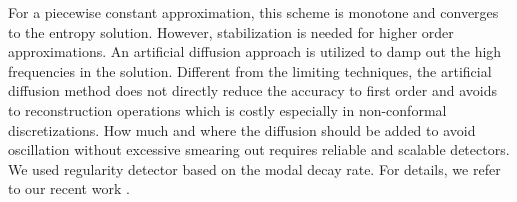 \documentclass[11pt,a4paper,twoside]{article}
\newcommand{\aref}[1]{%
	\begingroup%
	\def\chapterautorefname~##1\null{Chapter~##1\null}%
	\def\sectionautorefname~##1\null{Section~##1\null}%
	\def\subsectionautorefname~##1\null{Section~##1\null}%
	\def\subsubsectionautorefname~##1\null{Section~##1\null}%
	\def\figureautorefname~##1\null{Fig.~##1\null}%
	\def\tableautorefname~##1\null{Table~##1\null}%
	\def\equationautorefname~##1\null{Eq.(##1)\null}%
	\def\algorithmautorefname~##1\null{Alg.(##1)\null}%
	\autoref{#1}%
	\endgroup%
}
\begin{document}
	
	For a piecewise constant approximation, this scheme is monotone and converges to the entropy solution. However, stabilization is needed for higher order approximations. An artificial diffusion approach is utilized to damp out the high frequencies in the solution. Different from the limiting techniques, the artificial diffusion method does not directly reduce the accuracy to first order and avoids to reconstruction operations which is costly especially in non-conformal discretizations. How much and where the diffusion should be added to avoid oscillation without excessive smearing out requires reliable and scalable detectors. We used regularity detector based on the modal decay rate. For details, we refer to our recent work \cite{karakus_reinitialization_2015}.     
	
\end{document}
